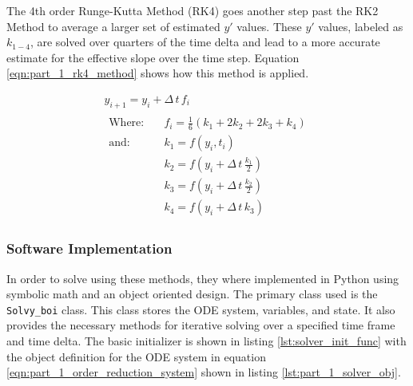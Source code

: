 \documentclass[12pt]{article}
\begin{document}
The 4th order Runge-Kutta Method (RK4) goes another step past the RK2 Method to average a larger set of estimated $y'$ values. These $y'$ values, labeled as $k_{1-4}$, are solved over quarters of the time delta and lead to a more accurate estimate for the effective slope over the time step. Equation \ref{eqn:part_1_rk4_method} shows how this method is applied.

\begin{equation}
    \label{eqn:part_1_rk4_method}
    \begin{gathered}
        y_{i+1} = y_i + \Delta \, t \, f_i \\
        \begin{aligned}
            \text{Where:} & \quad f_i = \frac{1}{6} \left( k_1 + 2k_2 + 2k_3 + k_4\right) \\
            \text{and:} & \quad k_1 = f \left(y_i, t_i\right) \\
            & \quad k_2=f\left(y_i + \Delta \, t \, \frac{k_1}{2}\right) \\
            & \quad k_3 = f \left(y_i + \Delta \, t \, \frac{k_2}{2}\right) \\
            & \quad k_4 = f \left( y_i + \Delta \, t \, k_3 \right)
        \end{aligned}
    \end{gathered}
\end{equation}

\subsubsection{Software Implementation}

In order to solve using these methods, they where implemented in Python using symbolic math and an object oriented design. The primary class used is the \texttt{Solvy\_boi} class. This class stores the ODE system, variables, and state. It also provides the necessary methods for iterative solving over a specified time frame and time delta. The basic initializer is shown in listing \ref{lst:solver_init_func} with the object definition for the ODE system in equation \ref{eqn:part_1_order_reduction_system} shown in listing \ref{lst:part_1_solver_obj}.


\end{document}
